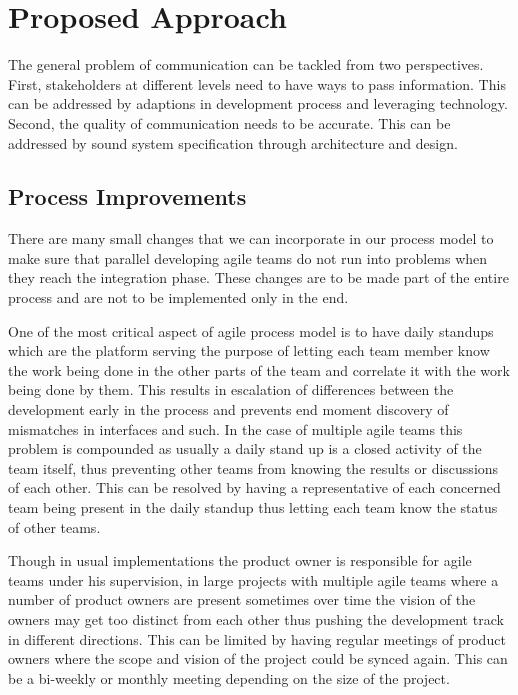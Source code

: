 \section{Proposed Approach}
\label{sec:prop_appro} 
The general problem of communication can be tackled from two perspectives.
First, stakeholders at different levels need to have ways to pass information.
This can be addressed by adaptions in development process and leveraging technology.
Second, the quality of communication needs to be accurate.
This can be addressed by sound system specification through architecture and design.

\subsection{Process Improvements} 
\label{sec:proc_impv}
	There are many small changes \cite{collabAcrossAgile_article} that we can incorporate in our process model to make sure that parallel developing agile teams do not run into problems when they reach the integration phase.
	These changes are to be made part of the entire process and are not to be implemented only in the end.

	One of the most critical aspect of agile process model is to have daily standups which are the platform serving the purpose of letting each team member know the work being done in the other parts of the team and correlate it with the work being done by them.
	This results in escalation of differences between the development early in the process and prevents end moment discovery of mismatches in interfaces and such.
	In the case of multiple agile teams this problem is compounded as usually a daily stand up is a closed activity of the team itself, thus preventing other teams from knowing the results or discussions of each other.
	This can be resolved by having a representative of each concerned team being present in the daily standup thus letting each team know the status of other teams.

Though in usual implementations the product owner is responsible for agile teams under his supervision, in large projects with multiple agile teams where a number of product owners are present sometimes over time the vision of the owners may get too distinct from each other thus pushing the development track in different directions.
This can be limited by having regular meetings of product owners where the scope and vision of the project could be synced again. This can be a bi-weekly or monthly meeting depending on the size of the project.

